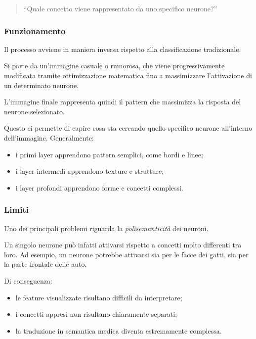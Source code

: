\begin{quote}
``Quale concetto viene rappresentato da uno specifico neurone?''
\end{quote}

\subsubsection{Funzionamento}

Il processo avviene in maniera inversa rispetto alla classificazione tradizionale.

Si parte da un'immagine casuale o rumorosa, che viene progressivamente modificata tramite ottimizzazione matematica fino a massimizzare l'attivazione di un determinato neurone.

L'immagine finale rappresenta quindi il pattern che massimizza la risposta del neurone selezionato.

Questo ci permette di capire cosa sta cercando quello specifico neurone all'interno dell'immagine. Generalmente:

\begin{itemize}
    \item i primi layer apprendono pattern semplici, come bordi e linee;
    
    \item i layer intermedi apprendono texture e strutture;
    
    \item i layer profondi apprendono forme e concetti complessi.
\end{itemize}

\subsubsection{Limiti}

Uno dei principali problemi riguarda la \textit{polisemanticità} dei neuroni.

Un singolo neurone può infatti attivarsi rispetto a concetti molto differenti tra loro. Ad esempio, un neurone potrebbe attivarsi sia per le facce dei gatti, sia per la parte frontale delle auto.

Di conseguenza:

\begin{itemize}
    \item le feature visualizzate risultano difficili da interpretare;
    
    \item i concetti appresi non risultano chiaramente separati;
    
    \item la traduzione in semantica medica diventa estremamente complessa.
\end{itemize}

